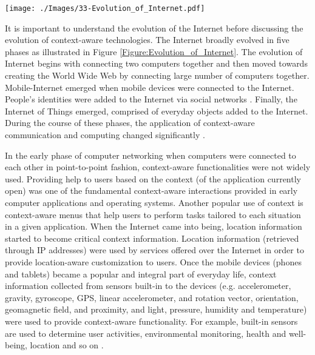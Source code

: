 \documentclass[journal]{IEEEtran}
\begin{document}
 
 \begin{figure*}[!t]
  \centering
\texttt{[image: ./Images/33-Evolution\_of\_Internet.pdf]}
 \vspace{-0.33cm}	
  \caption{Evolution of the Internet in five phases. The evolution of Internet begins with connecting two computers together and then moved towards creating  World Wide Web by connecting large number of computers together. The mobile-Internet emerged by connecting mobile devices to the Internet. Then, peoples'  identities joined the Internet via social networks. Finally, it is moving towards Internet of Things by connecting every day objects to the Internet}
  \label{Figure:Evolution_of_Internet}	
 \vspace{-0.4cm}	
 \end{figure*}
 
 
 
 
 
 
 
 
 

 
 
It is important to understand the evolution of the Internet before discussing the evolution of context-aware technologies. The Internet broadly evolved in five phases as illustrated in Figure \ref{Figure:Evolution_of_Internet}. The evolution of Internet begins with connecting two computers together and then moved towards creating the World Wide Web by connecting large number of computers together. Mobile-Internet emerged when mobile devices were connected to the Internet. People's identities were added to the Internet via social networks \cite{NP001}. Finally, the Internet of Things emerged, comprised of everyday objects added to the Internet. During the course of these phases, the application of context-aware communication and computing changed significantly \cite{ZMP007}.

In the early phase of computer networking when computers were connected to each other in point-to-point fashion, context-aware functionalities were not widely used. Providing help to users based on the context (of the application currently open) was one of the fundamental context-aware interactions provided in early computer applications and operating systems. Another popular use of context is context-aware menus that help users to perform tasks tailored to each situation in a given application. When the Internet came into being, location information started to become critical context information. Location information (retrieved through IP addresses) were used by services offered over the Internet in order to provide location-aware customization to users. Once the mobile devices (phones and tablets) became a popular and integral part of everyday life, context information collected from sensors built-in to the devices (e.g. accelerometer, gravity, gyroscope, GPS, linear accelerometer, and rotation vector, orientation, geomagnetic field, and proximity, and light, pressure, humidity and temperature) were used to provide context-aware functionality. For example, built-in sensors are used to determine user activities, environmental monitoring, health and well-being, location and so on \cite{P217}. 
\end{document}
